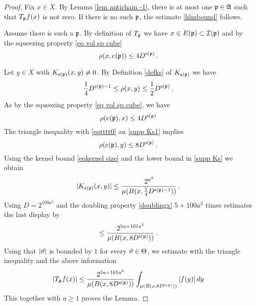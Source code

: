 \begin{proof}
Fix $x\in X$.  By Lemma \ref{lem antichain -1}, there is at most one $\mathfrak p \in \mathfrak{A}$
such that
    $T_{\mathfrak p} f(x)$ is not zero.
    If there is no such $\mathfrak p$, the estimate \eqref{hlmbound} follows.

    Assume there is such a $\mathfrak p$.
    By definition of $T_{\mathfrak p}$ we have $x\in E(\mathfrak p)\subset \mathcal{I}(\mathfrak p)$ and  by the squeezing property \eqref{eq vol sp cube}
\begin{equation}\label{eqtttt0}
    \rho(x, \mathrm{c}(\mathfrak p))\le 4D^{\mathrm{s}(\mathfrak p)}\, .
\end{equation}

Let $y\in X$ with  $K_{\mathrm{s}(\mathfrak p)}(x,y)\neq 0$. By Definition \eqref{defks} of $K_{\mathrm{s}(\mathfrak p)}$
we have
\begin{equation}\label{supp Ks1}
    \frac{1}{4} D^{\mathrm{s}(\mathfrak p)-1}
    \leq \rho(x,y) \leq \frac{1}{2} D^{\mathrm{s}(\mathfrak p)}\, .
\end{equation}
As by the squeezing property \eqref{eq vol sp cube}, we have
\begin{equation}
    \rho(\mathrm{c}(\mathfrak p),x)\le 4D^{\mathrm{s}(\mathfrak p)}
\end{equation}
The triangle inequality with \eqref{eqtttt0} an \eqref{supp Ks1} implies
\begin{equation}
    \rho(\mathrm{c}(\mathfrak p),y)\le 8D^{\mathrm{s}(\mathfrak p)}\, .
\end{equation}
Using the kernel bound \eqref{eqkernel size} and the lower bound in \eqref{supp Ks}
we obtain
\begin{equation}
|K_{\mathrm{s}(\mathfrak p)}(x,y)|\le \frac{2^{a^3}}{\mu(B(x,\frac 14 D^{{\mathrm{s}(\mathfrak p)}-1}))}\, .
\end{equation}
Using $D=2^{100a^2}$
and the doubling property \eqref{doublingx} $5 +100a^2$ times estimates
the last display by
\begin{equation}
\le \frac{2^{5a+101a^3}}{\mu(B(x,  8D^{\mathrm{s}(\mathfrak p)}))}\, .
\end{equation}
    Using that $|\vartheta|$ is bounded by $1$
    for every $\vartheta\in \Theta$, we estimate with the triangle inequality and the above information
    \begin{equation}
    | T_{\mathfrak p} f(x)|
    \le \frac{2^{5a+101 a^3}}{\mu(B(x, 8D^{\mathrm{s}(\mathfrak p)}))} \int _{\mu(B(x, 8D^{\mathrm{s}(\mathfrak p)}))} |f(y)|\, dy   \end{equation}
This together with $a\ge 1$ proves the Lemma.
\end{proof}

